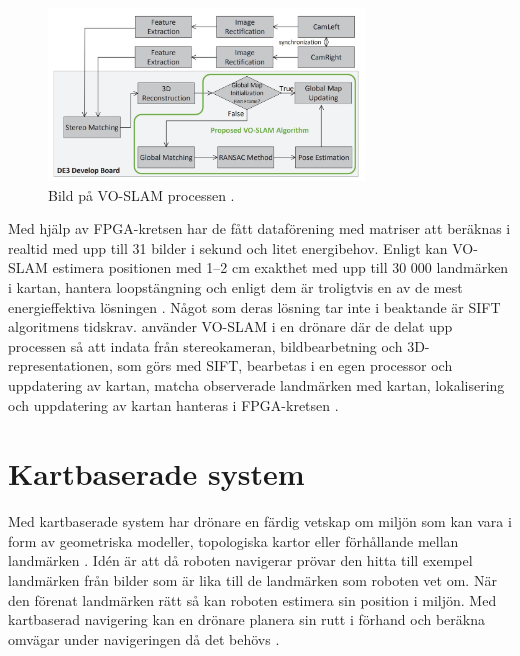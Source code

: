 \begin{figure}[ht]
    \begin{center}
    \includegraphics[width=0.75\textwidth]{voslam.JPG}
    \caption{Bild på VO-SLAM processen \citep{voslam}.}
    \label{voslamprocess}
    \end{center}
\end{figure}

Med hjälp av FPGA-kretsen har de fått dataförening med matriser att beräknas i realtid med upp till 31 bilder i sekund och litet energibehov. Enligt \cite{voslam} kan VO-SLAM estimera positionen med 1–2 cm exakthet med upp till 30 000 landmärken i kartan, hantera loopstängning och enligt dem är troligtvis en av de mest energieffektiva lösningen \citep{voslam}. Något som deras lösning tar inte i beaktande är SIFT algoritmens tidskrav. \cite{voslamlatif} använder VO-SLAM i en drönare där de delat upp processen så att indata från stereokameran, bildbearbetning och 3D-representationen, som görs med SIFT, bearbetas i en egen processor och uppdatering av kartan, matcha observerade landmärken med kartan, lokalisering och uppdatering av kartan hanteras i FPGA-kretsen \citep{voslamlatif}. 

\section{Kartbaserade system}

Med kartbaserade system har drönare en färdig vetskap om miljön som kan vara i form av geometriska modeller, topologiska kartor eller förhållande mellan landmärken \citep{982903}. Idén är att då roboten navigerar prövar den hitta till exempel landmärken från bilder som är lika till de landmärken som roboten vet om. När den förenat landmärken rätt så kan roboten estimera sin position i miljön. Med kartbaserad navigering kan en drönare planera sin rutt i förhand och beräkna omvägar under navigeringen då det behövs \citep{geospatial}. 

